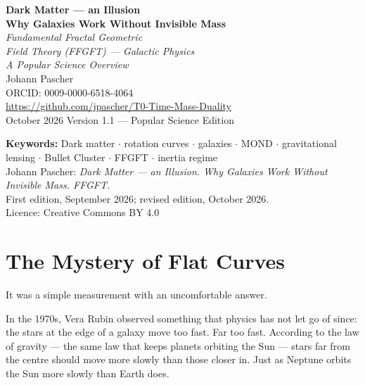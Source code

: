 \documentclass[11pt,oneside]{book}
\begin{document}
\frontmatter
\pagestyle{fancy}

\begin{titlepage}
  \centering\vspace*{1.5cm}
  {\Huge\bfseries\color{blue!70!black}
    Dark Matter — an Illusion}\\[0.6cm]
  {\Large\bfseries\color{blue!40!black}
    Why Galaxies Work Without Invisible Mass}\\[1cm]
  {\LARGE\itshape Fundamental Fractal Geometric\\[0.2cm]
    Field Theory (FFGFT) — Galactic Physics}\\[0.5cm]
  {\large\itshape A Popular Science Overview}\\[2cm]
  {\large Johann Pascher}\\[0.3cm]
  {\normalsize ORCID: 0009-0000-6518-4064}\\[0.3cm]
  {\normalsize\url{https://github.com/jpascher/T0-Time-Mass-Duality}}\\[1.5cm]
  {\normalsize October 2026}
  \vfill{\small Version 1.1 --- Popular Science Edition}
\end{titlepage}

\newpage\thispagestyle{empty}%
{\small\noindent\textbf{Keywords:} Dark matter $\cdot$
rotation curves $\cdot$ galaxies $\cdot$ MOND $\cdot$
gravitational lensing $\cdot$ Bullet Cluster $\cdot$ FFGFT $\cdot$
inertia regime\\[1em]
\noindent Johann Pascher: \textit{Dark Matter — an Illusion.
Why Galaxies Work Without Invisible Mass. FFGFT.}\\
First edition, September 2026; revised edition, October 2026.\\[0.6em]
\noindent Licence: Creative Commons BY 4.0}

\tableofcontents
\mainmatter

\chapter{The Mystery of Flat Curves}

It was a simple measurement with an uncomfortable answer.

In the 1970s, Vera Rubin observed something that physics has
not let go of since: the stars at the edge of a galaxy move
too fast. Far too fast. According to the law of gravity —
the same law that keeps planets orbiting the Sun — stars
far from the centre should move more slowly than those
closer in. Just as Neptune orbits the Sun more slowly than
Earth does.
\end{document}
